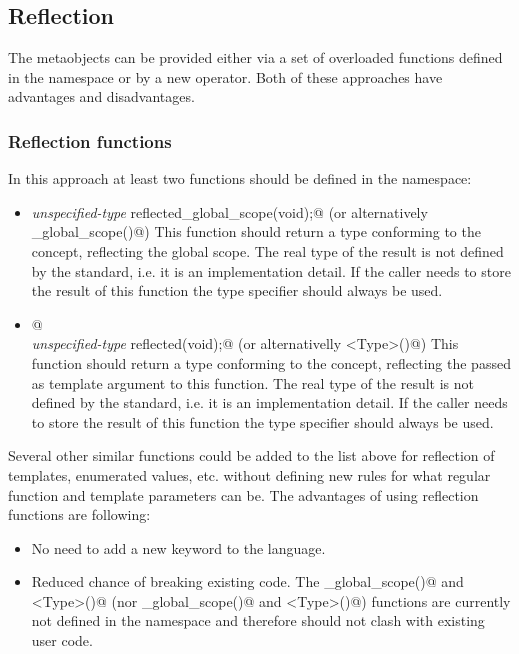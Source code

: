 \subsection{Reflection}

The metaobjects can be provided either via a set of overloaded
functions defined in the \verb@std@ namespace or by a new operator.
Both of these approaches have advantages and disadvantages.

\subsubsection{Reflection functions}

In this approach at least two functions should be defined
in the \verb@std@ namespace:

\begin{itemize}
	\item{{\em unspecified-type} \verb@ reflected_global_scope(void);@} (or
	alternatively \verb@mirrored_global_scope()@)
	This function should return a type conforming to the {}
	concept, reflecting the global scope.
	The real type of the result is not defined by the standard, i.e. it is an implementation detail. 
	If the caller needs to store the result of this function the \verb@auto@ type
	specifier should always be used.

	\item{\verb@template <typename Type>@\\
	{\em unspecified-type} \verb@ reflected(void);@} (or alternativelly \verb@mirrored<Type>()@)
	This function should return a type conforming to the {}
	concept, reflecting the \verb@Type@ passed as template argument to this function.
	The real type of the result is not defined by the standard, i.e. it is an implementation detail. 
	If the caller needs to store the result of this function the \verb@auto@ type
	specifier should always be used.
\end{itemize}

Several other similar functions could be added to the list above
for reflection of templates, enumerated values, etc. without defining
new rules for what regular function and template parameters can be.
The advantages of using reflection functions are following:

\begin{itemize}
	\item No need to add a new keyword to the language.

	\item Reduced chance of breaking existing code. The \verb@reflected_global_scope()@
	and \verb@reflected<Type>()@ (nor \verb@mirrored_global_scope()@ and 
	\verb@mirrored<Type>()@) functions are currently not defined in the \verb@std@
	namespace and therefore should not clash with existing user code.
\end{itemize}

